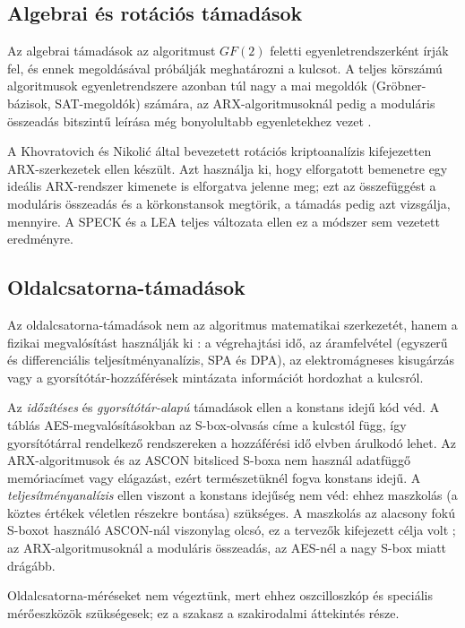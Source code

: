 \documentclass[a4paper,12pt]{report}
\theoremstyle{definition}
\theoremstyle{remark}
\begin{document}
\subsection{Algebrai és rotációs támadások}

Az algebrai támadások az algoritmust $GF(2)$ feletti egyenletrendszerként írják fel, és ennek megoldásával próbálják meghatározni a kulcsot. A teljes körszámú algoritmusok egyenletrendszere azonban túl nagy a mai megoldók (Gröbner-bázisok, SAT-megoldók) számára, az ARX-algoritmusoknál pedig a moduláris összeadás bitszintű leírása még bonyolultabb egyenletekhez vezet \cite{Biryukov2017}.

A Khovratovich és Nikolić által bevezetett rotációs kriptoanalízis \cite{Khovratovich2010} kifejezetten ARX-szerkezetek ellen készült. Azt használja ki, hogy elforgatott bemenetre egy ideális ARX-rendszer kimenete is elforgatva jelenne meg; ezt az összefüggést a moduláris összeadás és a körkonstansok megtörik, a támadás pedig azt vizsgálja, mennyire. A SPECK és a LEA teljes változata ellen ez a módszer sem vezetett eredményre.

\subsection{Oldalcsatorna-támadások}

Az oldalcsatorna-támadások nem az algoritmus matematikai szerkezetét, hanem a fizikai megvalósítást használják ki \cite{Kocher1996}: a végrehajtási idő, az áramfelvétel (egyszerű és differenciális teljesítményanalízis, SPA és DPA), az elektromágneses kisugárzás vagy a gyorsítótár-hozzáférések mintázata információt hordozhat a kulcsról.

Az \emph{időzítéses} és \emph{gyorsítótár-alapú} támadások ellen a konstans idejű kód véd. A táblás AES-megvalósításokban az S-box-olvasás címe a kulcstól függ, így gyorsítótárral rendelkező rendszereken a hozzáférési idő elvben árulkodó lehet. Az ARX-algoritmusok és az ASCON bitsliced S-boxa nem használ adatfüggő memóriacímet vagy elágazást, ezért természetüknél fogva konstans idejű. A \emph{teljesítményanalízis} ellen viszont a konstans idejűség nem véd: ehhez maszkolás (a köztes értékek véletlen részekre bontása) szükséges. A maszkolás az alacsony fokú S-boxot használó ASCON-nál viszonylag olcsó, ez a tervezők kifejezett célja volt \cite{Dobraunig2021}; az ARX-algoritmusoknál a moduláris összeadás, az AES-nél a nagy S-box miatt drágább.

Oldalcsatorna-méréseket nem végeztünk, mert ehhez oszcilloszkóp és speciális mérőeszközök szükségesek; ez a szakasz a szakirodalmi áttekintés része.
\end{document}
